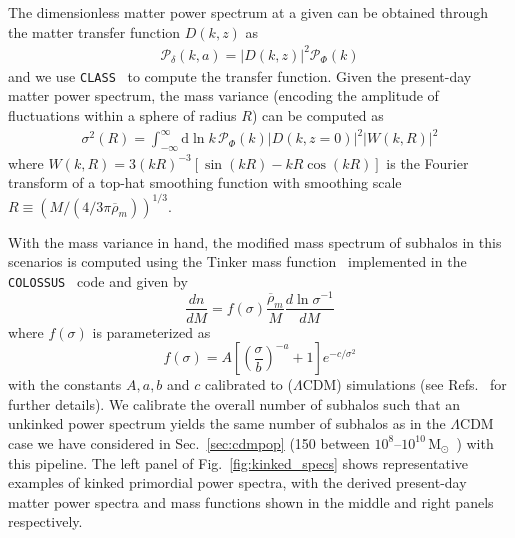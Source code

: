 \documentclass[twocolumn]{aastex63}
\newcommand{\dd}{\mathrm{d}}
\begin{document}
The dimensionless matter power spectrum at a given can be obtained through the matter transfer function $D(k,z)$ as
\begin{align}
\mathcal{P}_{\delta}(k,a) = \left|D\left(k,z\right)\right|^2 \mathcal{P}_{\Phi}(k) 
\end{align}
and we use \texttt{CLASS}~\cite{Blas:2011rf} to compute the transfer function. Given the present-day matter power spectrum, the mass variance (encoding the amplitude of fluctuations within a sphere of radius $R$) can be computed as 
\begin{align}
\sigma^2(R) = \int_{-\infty}^{\infty} \dd \ln k \, \mathcal{P}_{\Phi}(k) \left|D\left(k,z=0\right)\right|^2  \left| W(k,R) \right|^2
\end{align}
where  $W(k,R) = 3 (kR)^{-3}[\sin(kR)-kR\cos(kR)]$ is the Fourier transform of a top-hat smoothing function with smoothing scale $R\equiv (M / (4/3\pi\overline{\rho}_{m}))^{1/3}$.

With the mass variance in hand, the modified mass spectrum of subhalos in this scenarios is computed using the Tinker mass function~\cite{2008ApJ...688..709T} implemented in the \texttt{COLOSSUS}~\cite{2018ApJS..239...35D} code and given by
\begin{equation}
\frac{d n}{d M}=f(\sigma) \frac{\overline{\rho}_{m}}{M} \frac{d \ln \sigma^{-1}}{d M}
\end{equation}
where $f(\sigma)$ is parameterized as
\begin{equation}
f(\sigma)=A\left[\left(\frac{\sigma}{b}\right)^{-a}+1\right] e^{-c / \sigma^{2}}
\end{equation}
with the constants $A, a, b$ and $c$ calibrated to ($\Lambda$CDM) simulations (see Refs.~\cite{2008ApJ...688..709T,2018ApJS..239...35D} for further details). We calibrate the overall number of subhalos such that an unkinked power spectrum yields the same number of subhalos as in the $\Lambda$CDM case we have considered in Sec.~\ref{sec:cdmpop} (150 between $10^8$--$10^{10}$\,M$_\odot$~\cite{Hutten:2016jko}) with this pipeline. The left panel of Fig.~\ref{fig:kinked_specs} shows representative examples of kinked primordial power spectra, with the derived present-day matter power spectra and mass functions shown in the middle and right panels respectively.
\end{document}
